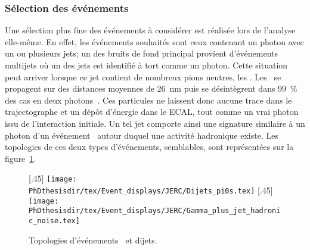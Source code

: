\subsubsection{Sélection des événements}
Une sélection plus fine des événements à considérer est réalisée lors de l'analyse elle-même.
En effet, les événements souhaités sont ceux contenant un photon avec un ou plusieurs jets;
un des bruits de fond principal provient d'événements multijets où un des jets est identifié à tort comme un photon.
Cette situation peut arriver lorsque ce jet contient de nombreux pions neutres, les \pionnull.
Les \pionnull\ se propagent sur des distances moyennes de \SI{26}{\nano\meter} puis se désintègrent dans \SI{99}{\%} des cas en deux photons~\cite{PDG_booklet_2018}.
Ces particules ne laissent donc aucune trace dans le trajectographe et un dépôt d'énergie dans le ECAL, tout comme un vrai photon issu de l'interaction initiale.
Un tel jet comporte ainsi une signature similaire à un photon d'un événement \Gjet\ autour duquel une activité hadronique existe.
Les topologies de ces deux types d'événements, semblables, sont représentées sur la figure~\ref{fig-Gamma_plus_jet_events_real_faked}.
\begin{figure}[h]
\centering
{}[.45\textwidth]
{\texttt{[image: \\PhDthesisdir/tex/Event\_displays/JERC/Dijets\_pi0s.tex]}}
\hfill
{}[.45\textwidth]{\texttt{[image: \\PhDthesisdir/tex/Event\_displays/JERC/Gamma\_plus\_jet\_hadronic\_noise.tex]}}
\caption{Topologies d'événements \Gjet\ et dijets.}
\label{fig-Gamma_plus_jet_events_real_faked}
\end{figure}
